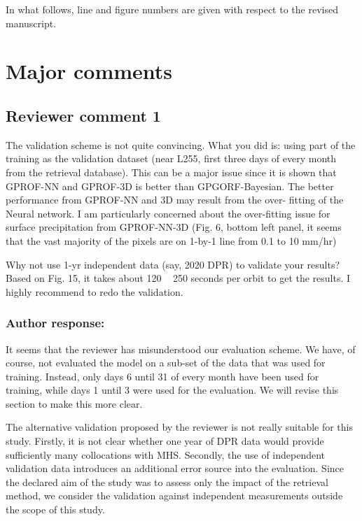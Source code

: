 In what follows, line and figure numbers are given with respect to the revised manuscript.

\section{Major comments}

\subsection*{Reviewer comment 1}

The validation scheme is not quite convincing. What you did is: using part of the training as
the validation dataset (near L255, first three days of every month from the retrieval database).
This can be a major issue since it is shown that GPROF-NN and GPROF-3D is better than
GPGORF-Bayesian. The better performance from GPROF-NN and 3D may result from the over-
fitting of the Neural network. I am particularly concerned about the over-fitting issue for
surface precipitation from GPROF-NN-3D (Fig. 6, bottom left panel, it seems that the vast
majority of the pixels are on 1-by-1 line from 0.1 to 10 mm/hr)

Why not use 1-yr independent data (say, 2020 DPR) to validate your results? Based on Fig. 15, it
takes about 120 ~ 250 seconds per orbit to get the results. I highly recommend to redo the
validation.

\subsubsection{Author response:}

It seems that the reviewer has misunderstood our evaluation scheme. We have, of
course, not evaluated the model on a sub-set of the data that was used for
training. Instead, only days 6 until 31 of every month have been used for
training, while days 1 until 3 were used for the evaluation. We will revise this
section to make this more clear.

The alternative validation proposed by the reviewer is not really suitable for
this study. Firstly, it is not clear whether one year of DPR data would provide
sufficiently many collocations with MHS. Secondly, the use of
independent validation data introduces an additional error source into the
evaluation. Since the declared aim of the study was to assess only the impact of
the retrieval method, we consider the validation against independent
measurements outside the scope of this study.

